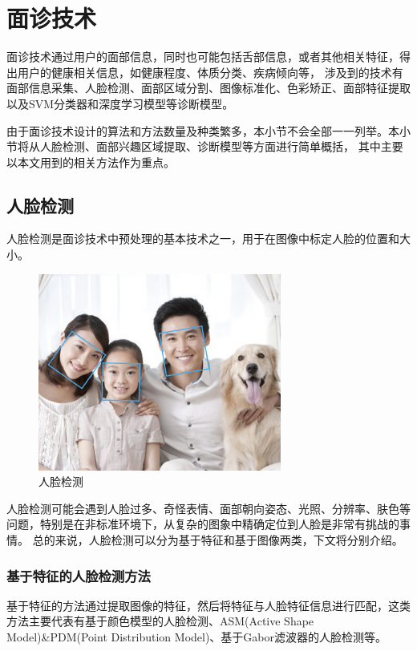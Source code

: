 \section{面诊技术}
面诊技术通过用户的面部信息，同时也可能包括舌部信息，或者其他相关特征，得出用户的健康相关信息，如健康程度、体质分类、疾病倾向等，
涉及到的技术有面部信息采集、人脸检测、面部区域分割、图像标准化、色彩矫正、面部特征提取以及SVM分类器和深度学习模型等诊断模型\cite{宋海贝2018中医面诊信息自动识别方法研究进展, 林锋2019中医面诊系统调研报告}。

由于面诊技术设计的算法和方法数量及种类繁多，本小节不会全部一一列举。本小节将从人脸检测、面部兴趣区域提取、诊断模型等方面进行简单概括，
其中主要以本文用到的相关方法作为重点。

\subsection{人脸检测}
人脸检测是面诊技术中预处理的基本技术之一，用于在图像中标定人脸的位置和大小。

\begin{figure}[h]
    \centering
    \includegraphics[width=8cm]{images/face_detcetion.png}
    \caption{人脸检测 \protect\footnotemark}
    \label{fig:face_plus }
\end{figure}

人脸检测可能会遇到人脸过多、奇怪表情、面部朝向姿态、光照、分辨率、肤色等问题，特别是在非标准环境下，从复杂的图象中精确定位到人脸是非常有挑战的事情。
总的来说，人脸检测可以分为基于特征和基于图像两类，下文将分别介绍。

\subsubsection{基于特征的人脸检测方法}
基于特征的方法通过提取图像的特征，然后将特征与人脸特征信息进行匹配，这类方法主要代表有基于颜色模型的人脸检测\cite{dhivakar2015face}、ASM(Active Shape Model)\&PDM(Point Distribution Model)\cite{kumar2019face}、基于Gabor滤波器的人脸检测\cite{sharif2011face}等。

